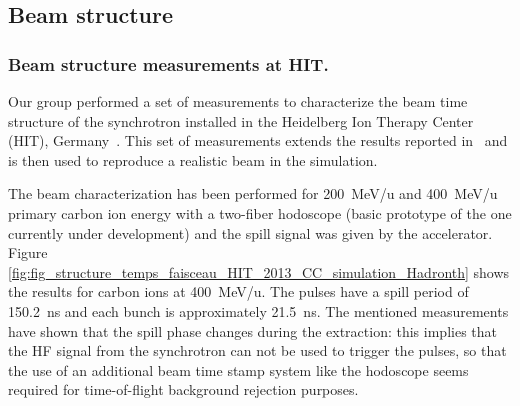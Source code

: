 
\subsection{Beam structure}
\label{subsection:modelisation_fasceau_ions_CC_hadrontherapy_Geant4}
\subsubsection{Beam structure measurements at HIT.}\label{beam_measurement}
Our group performed a set of measurements to characterize the beam time structure of the synchrotron installed in the Heidelberg Ion Therapy Center (HIT), Germany~\cite{HIT_timestructure}. This set of measurements extends the results reported in~\cite{HIT_timestructure} and is then used to reproduce a realistic beam in the simulation.

The beam characterization has been performed for 200~MeV/u and 400~MeV/u primary carbon ion energy with a two-fiber hodoscope (basic prototype of the one currently under development) and the spill signal was given by the accelerator. Figure \ref{fig:fig_structure_temps_faisceau_HIT_2013_CC_simulation_Hadronth} shows the results for carbon ions at 400~MeV/u. The pulses have a spill period of 150.2~ns and each bunch is approximately 21.5~ns.
The mentioned measurements have shown that the spill phase changes during the extraction: this implies that the HF signal from the synchrotron can not be used to trigger the pulses, so that the use of an additional beam time stamp system like the hodoscope seems required for time-of-flight background rejection purposes.

